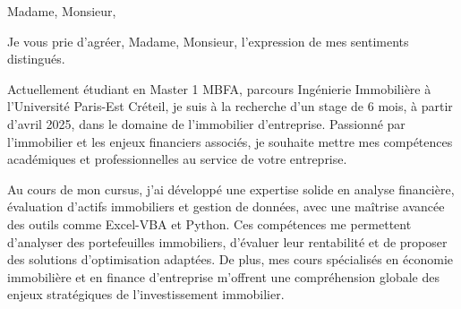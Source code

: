 \documentclass[11pt,a4paper,french]{moderncv}        %
\begin{document}


\date{A Créteil, le \today} 
\opening{Madame, Monsieur,}
\closing{Je vous prie d’agréer, Madame, Monsieur, l’expression de mes sentiments distingués.}
\makelettertitle

\justifying

\hspace*{0.7cm}
Actuellement étudiant en Master 1 MBFA, parcours Ingénierie Immobilière à l’Université Paris-Est Créteil, je suis à la recherche d’un stage de 6 mois, à partir d’avril 2025, dans le domaine de l’immobilier d'entreprise. Passionné par l’immobilier et les enjeux financiers associés, je souhaite mettre mes compétences académiques et professionnelles au service de votre entreprise.

Au cours de mon cursus, j’ai développé une expertise solide en analyse financière, évaluation d’actifs immobiliers et gestion de données, avec une maîtrise avancée des outils comme Excel-VBA et Python. Ces compétences me permettent d’analyser des portefeuilles immobiliers, d’évaluer leur rentabilité et de proposer des solutions d’optimisation adaptées. De plus, mes cours spécialisés en économie immobilière et en finance d'entreprise m’offrent une compréhension globale des enjeux stratégiques de l’investissement immobilier.
\end{document}
